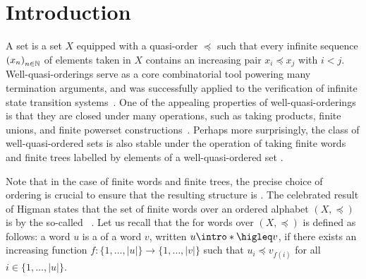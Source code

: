 \section{Introduction}
\label{introduction:sec}

\AP A  set is a set $X$ equipped with a quasi-order
$\preceq$ such that every infinite sequence $\seqof{x_n}$ of elements taken in
$X$ contains an increasing pair $x_i \preceq x_j$ with $i < j$. Well-quasi-orderings serve
as a core combinatorial tool powering many termination arguments, and was
successfully applied to the verification of infinite state transition
systems~\cite{ABDU96,ABDU98}. One of the appealing properties of
well-quasi-orderings is that they are closed under many operations, such as
taking products, finite unions, and finite powerset
constructions~\cite{SCSC12}. Perhaps more surprisingly, the class of
well-quasi-ordered sets is also stable under the operation of taking finite
words and finite trees labelled by elements of a well-quasi-ordered set
\cite{HIG52,KRU72}.

\AP Note that in the case of finite words and finite trees, the precise choice
of ordering is crucial to ensure that the resulting structure is
. The celebrated result of Higman states that the set of
finite words over an ordered alphabet $(X, \preceq)$ is 
by the so-called ~\cite{HIG52}. Let us recall
that the  for words over $(X, \preceq)$ is defined as
follows: a word $u$ is a  of a word $v$, written $u
\intro*\higleq v$, if there exists an increasing function $f \colon \{1,
\ldots, |u|\} \to \{1, \ldots, |v|\}$ such that $u_i \preceq v_{f(i)}$ for all
$i \in \{1, \ldots, |u|\}$.

